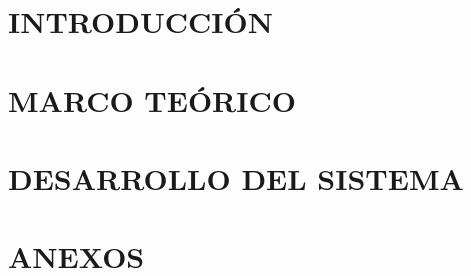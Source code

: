 \documentclass[12pt]{article}
\begin{document}
\newpage


\setcounter{page}{1}
\renewcommand{\thepage}{\arabic{page}}

\section{INTRODUCCIÓN}


\newpage
\section{MARCO TEÓRICO}



\newpage
\section{DESARROLLO DEL SISTEMA}



\newpage

\renewcommand{\refname}{REFERENCIAS}
{}


\newpage


\section{ANEXOS}


\end{document}
